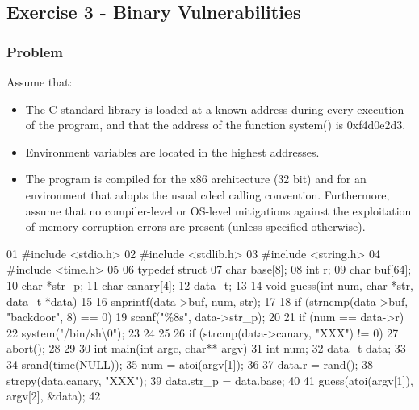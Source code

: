 \documentclass{article}
\begin{document}
\subsection{Exercise 3 - Binary Vulnerabilities}
\subsubsection*{Problem}
Assume that:
\begin{itemize}
    \item The C standard library is loaded at a known address during every execution of the program, and that the address of the function system() is 0xf4d0e2d3.
    \item Environment variables are located in the highest addresses.
    \item The program is compiled for the x86 architecture (32 bit) and for an environment that adopts the usual cdecl calling convention. Furthermore, assume that no compiler-level or OS-level mitigations against the exploitation of memory corruption errors are present (unless specified otherwise).

\end{itemize}
01 \#include <stdio.h>
02 \#include <stdlib.h>
03 \#include <string.h>
04 \#include <time.h>
05
06 typedef struct {
07     char base[8];
08     int r;
09     char buf[64];
10     char *str\_p;
11     char canary[4];
12 } data\_t;
13
14 void guess(int num, char *str, data\_t *data) {
15
16     snprintf(data->buf, num, str);
17
18     if (strncmp(data->buf, "backdoor", 8) == 0){
19         scanf("\%8s", data->str\_p);
20
21         if (num == data->r){
22             system("/bin/sh\textbackslash{}0");
23         }
24     }
25
26     if (strcmp(data->canary, "XXX") != 0)
27         abort();
28 }
29
30 int main(int argc, char** argv) {
31     int num;
32     data\_t data;
33
34     srand(time(NULL));
35     num = atoi(argv[1]);
36
37     data.r = rand();
38     strcpy(data.canary, "XXX");
39     data.str\_p = data.base;
40
41     guess(atoi(argv[1]), argv[2], \&data);
42 }
\end{document}
